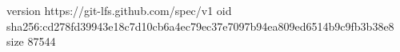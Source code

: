 version https://git-lfs.github.com/spec/v1
oid sha256:cd278fd39943e18c7d10cb6a4ec79ec37e7097b94ea809ed6514b9c9fb3b38e8
size 87544
